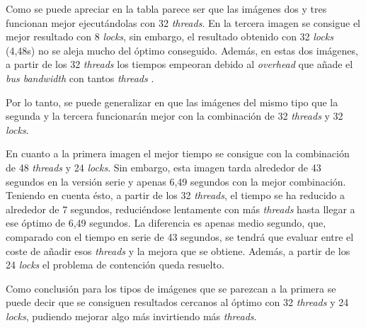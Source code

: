 Como se puede apreciar en la tabla parece ser que las im\'{a}genes dos y tres funcionan mejor ejecut\'{a}ndolas con 32 \textit{threads}. En la tercera imagen se consigue el mejor resultado con 8 \textit{locks}, sin embargo, el resultado obtenido con 32 \textit{locks} (4,48s) no se aleja mucho del \'{o}ptimo conseguido. Adem\'{a}s, en estas dos im\'{a}genes, a partir de los 32 \textit{threads} los tiempos empeoran debido al \textit{overhead} que a\~{n}ade el \textit{bus bandwidth} con tantos \textit{threads}  .

Por lo tanto, se puede generalizar en que las im\'{a}genes del mismo tipo que la segunda y la tercera funcionar\'{a}n mejor con la combinaci\'{o}n de 32 \textit{threads} y 32 \textit{locks}.

En cuanto a la primera imagen el mejor tiempo se consigue con la combinaci\'{o}n de 48 \textit{threads} y 24 \textit{locks}. Sin embargo, esta imagen tarda alrededor de 43 segundos en la versi\'{o}n serie y apenas 6,49 segundos con la mejor combinaci\'{o}n. Teniendo en cuenta \'{e}sto, a partir de los 32 \textit{threads}, el tiempo se ha reducido a alrededor de 7 segundos, reduci\'{e}ndose lentamente con m\'{a}s \textit{threads} hasta llegar a ese \'{o}ptimo de 6,49 segundos. La diferencia es apenas medio segundo, que, comparado con el tiempo en serie de 43 segundos, se tendr\'{a} que evaluar entre el coste de a\~{n}adir esos \textit{threads} y la mejora que se obtiene. Adem\'{a}s, a partir de los 24 \textit{locks} el problema de contenci\'{o}n queda resuelto. 

Como conclusi\'{o}n para los tipos de im\'{a}genes que se parezcan a la primera se puede decir que se consiguen resultados cercanos al \'{o}ptimo con 32 \textit{threads} y 24 \textit{locks}, pudiendo mejorar algo m\'{a}s invirtiendo m\'{a}s \textit{threads}.